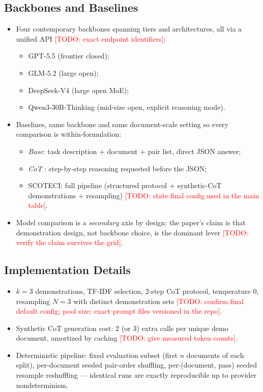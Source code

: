 \documentclass[11pt]{article}
\newcommand{\todo}[1]{\textcolor{red}{[TODO: #1]}}
\newcommand{\method}{SCOTECI}
\begin{document}
\subsection{Backbones and Baselines}
\begin{itemize}
  \item Four contemporary backbones spanning tiers and architectures, all via
        a unified API \todo{exact endpoint identifiers}:
        \begin{itemize}
          \item GPT-5.5 (frontier closed);
          \item GLM-5.2 (large open);
          \item DeepSeek-V4 (large open MoE);
          \item Qwen3-30B-Thinking (mid-size open, explicit reasoning mode).
        \end{itemize}
  \item Baselines, same backbone and same document-scale setting so every
        comparison is within-formulation:
        \begin{itemize}
          \item \emph{Base}: task description + document + pair list, direct
                JSON answer;
          \item \emph{CoT} \citep{wei2022chain}: step-by-step reasoning
                requested before the JSON;
          \item \method{}: full pipeline (structured protocol + synthetic-CoT
                demonstrations + resampling) \todo{state final config used in
                the main table}.
        \end{itemize}
  \item Model comparison is a \emph{secondary} axis by design: the paper's
        claim is that demonstration design, not backbone choice, is the
        dominant lever \todo{verify the claim survives the grid}.
\end{itemize}

\subsection{Implementation Details}
\begin{itemize}
  \item $k=3$ demonstrations, TF-IDF selection, 2-step CoT protocol,
        temperature 0, resampling $N=3$ with distinct demonstration sets
        \todo{confirm final default config; pool size; exact prompt files
        versioned in the repo}.
  \item Synthetic CoT generation cost: 2 (or 3) extra calls per unique
        demo document, amortized by caching \todo{give measured token counts}.
  \item Deterministic pipeline: fixed evaluation subset (first $n$ documents
        of each split), per-document seeded pair-order shuffling, per-(document,
        pass) seeded resample reshuffling --- identical runs are exactly
        reproducible up to provider nondeterminism.
\end{itemize}
\end{document}
